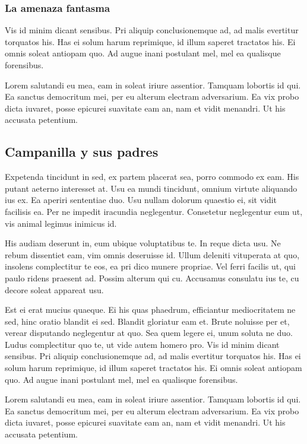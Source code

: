 \documentclass[a4paper, 11pt, titlepage, twocolumn]{book}
\begin{document}
\subsubsection{La amenaza fantasma}

Vis id minim dicant sensibus. Pri aliquip conclusionemque ad, ad malis evertitur torquatos his. Has ei solum harum reprimique, id illum saperet tractatos his. Ei omnis soleat antiopam quo. Ad augue inani postulant mel, mel ea qualisque forensibus.

Lorem salutandi eu mea, eam in soleat iriure assentior. Tamquam lobortis id qui. Ea sanctus democritum mei, per eu alterum electram adversarium. Ea vix probo dicta iuvaret, posse epicurei suavitate eam an, nam et vidit menandri. Ut his accusata petentium.

\subsection{Campanilla y sus padres}

Expetenda tincidunt in sed, ex partem placerat sea, porro commodo ex eam. His putant aeterno interesset at. Usu ea mundi tincidunt, omnium virtute aliquando ius ex. Ea aperiri sententiae duo. Usu nullam dolorum quaestio ei, sit vidit facilisis ea. Per ne impedit iracundia neglegentur. Consetetur neglegentur eum ut, vis animal legimus inimicus id.

His audiam deserunt in, eum ubique voluptatibus te. In reque dicta usu. Ne rebum dissentiet eam, vim omnis deseruisse id. Ullum deleniti vituperata at quo, insolens complectitur te eos, ea pri dico munere propriae. Vel ferri facilis ut, qui paulo ridens praesent ad. Possim alterum qui cu. Accusamus consulatu ius te, cu decore soleat appareat usu.

Est ei erat mucius quaeque. Ei his quas phaedrum, efficiantur mediocritatem ne sed, hinc oratio blandit ei sed. Blandit gloriatur eam et. Brute noluisse per et, verear disputando neglegentur at quo. Sea quem legere ei, unum soluta ne duo. Ludus complectitur quo te, ut vide autem homero pro.
\label{HOLA}
Vis id minim dicant sensibus. Pri aliquip conclusionemque ad, ad malis evertitur torquatos his. Has ei solum harum reprimique, id illum saperet tractatos his. Ei omnis soleat antiopam quo. Ad augue inani postulant mel, mel ea qualisque forensibus.

Lorem salutandi eu mea, eam in soleat iriure assentior. Tamquam lobortis id qui. Ea sanctus democritum mei, per eu alterum electram adversarium. Ea vix probo dicta iuvaret, posse epicurei suavitate eam an, nam et vidit menandri. Ut his accusata petentium.
\end{document}
